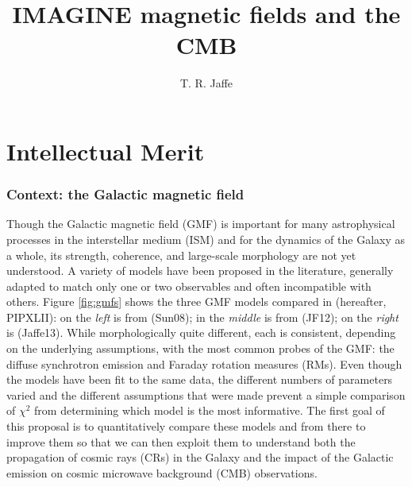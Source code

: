 \documentclass[12pt]{article}
\title{\vspace{-2cm}IMAGINE magnetic fields and the CMB}
\author{T. R.  Jaffe}
\begin{document}


\section*{Intellectual Merit}


\subsubsection*{Context:  the Galactic magnetic field}\label{sec:gmfs}

Though the Galactic magnetic field (GMF) is important for many astrophysical processes in the interstellar medium (ISM) and for the dynamics of the Galaxy as a whole, its strength, coherence, and large-scale morphology are not yet understood.  A variety of models have been proposed in the literature, generally adapted to match only one or two observables and often incompatible with others. Figure \ref{fig:gmfs} shows the three GMF models compared in \citet{pipXLII} (hereafter, PIPXLII): on the {\it left} is from \citet{sun08} (Sun08); in the {\it middle} is from \citet{jansson12b} (JF12); on the {\it right} is \citet{Jaffe:2013} (Jaffe13). While morphologically quite different, each is consistent, depending on the underlying assumptions, with the most common probes of the GMF:  the diffuse synchrotron emission and Faraday rotation measures (RMs). Even though the models have been fit to the same data, the different numbers of parameters varied and the different assumptions that were made prevent a simple comparison of $\chi^2$ from determining which model is the most informative.  The first goal of this proposal is to quantitatively compare these models and from there to improve them so that we can then exploit them to understand both the propagation of cosmic rays (CRs) in the Galaxy and the impact of the Galactic emission on cosmic microwave background (CMB) observations.
\end{document}
